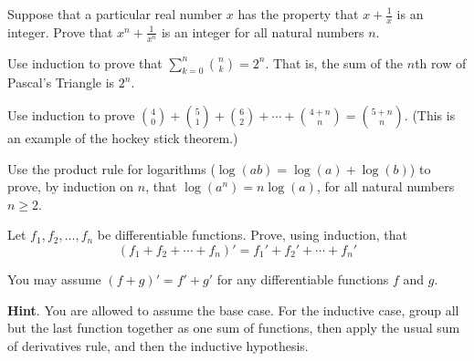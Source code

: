 \documentclass[10pt,]{book}
\theoremstyle{plain}
\theoremstyle{definition}
\theoremstyle{definition}
\theoremstyle{definition}
\theoremstyle{definition}
\numberwithin{equation}{chapter}
\def\d{\displaystyle}
\begin{document}
\begin{divisionexercise}{18}\hypertarget{exercise-273}{}
\hypertarget{p-2216}{}%
Suppose that a particular real number \(x\) has the property that \(x + \frac{1}{x}\) is an integer. Prove that \(x^n + \frac{1}{x^n}\) is an integer for all natural numbers \(n\).%
\end{divisionexercise}%
\begin{divisionexercise}{19}\hypertarget{exercise-274}{}
\hypertarget{p-2219}{}%
Use induction to prove that \(\d\sum_{k=0}^n {n \choose k} = 2^n\). That is, the sum of the \(n\)th row of Pascal's Triangle is \(2^n\).%
\end{divisionexercise}%
\begin{divisionexercise}{20}\hypertarget{exercise-275}{}
\hypertarget{p-2220}{}%
Use induction to prove \({4 \choose 0} + {5 \choose 1} + {6 \choose 2} + \cdots + {4+n \choose n} = {5+n \choose n}\). (This is an example of the hockey stick theorem.)%
\end{divisionexercise}%
\begin{divisionexercise}{21}\hypertarget{exercise-276}{}
\hypertarget{p-2221}{}%
Use the product rule for logarithms (\(\log(ab) = \log(a) + \log(b)\)) to prove, by induction on \(n\), that \(\log(a^n) = n \log(a)\), for all natural numbers \(n \ge 2\).%
\end{divisionexercise}%
\begin{divisionexercise}{22}\hypertarget{exercise-277}{}
\hypertarget{p-2224}{}%
Let \(f_1, f_2,\ldots, f_n\) be differentiable functions. Prove, using induction, that%
\begin{equation*}
(f_1 + f_2 + \cdots + f_n)' = f_1' + f_2' + \cdots + f_n'
\end{equation*}
%
\par
\hypertarget{p-2225}{}%
You may assume \((f+g)' = f' + g'\) for any differentiable functions \(f\) and \(g\).%
\par\smallskip%
\noindent\textbf{Hint}.\hypertarget{hint-74}{}\quad%
\hypertarget{p-2226}{}%
You are allowed to assume the base case. For the inductive case, group all but the last function together as one sum of functions, then apply the usual sum of derivatives rule, and then the inductive hypothesis.%
\end{divisionexercise}%
\end{document}
